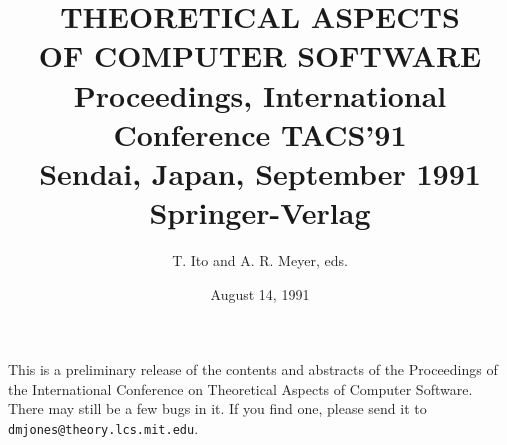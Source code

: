 
\title{THEORETICAL ASPECTS\\ OF COMPUTER SOFTWARE\\
Proceedings, International Conference TACS'91\\
Sendai, Japan, September 1991\\
Springer-Verlag}

\author{T. Ito and A. R. Meyer, eds.}

\date{August 14, 1991}



\maketitle

\noindent This is a preliminary release of the contents and abstracts
of the Proceedings of the International Conference on Theoretical
Aspects of Computer Software.  There may still be a few bugs in it.
If you find one, please send it to {\tt dmjones@theory.lcs.mit.edu}.

